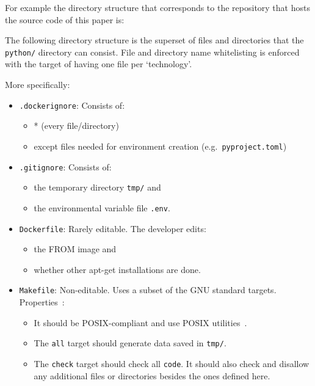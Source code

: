 \documentclass[journal]{IEEEtran}
\begin{document}
For example the directory structure that corresponds to the repository that hosts the source code of this paper is:

The following directory structure is the superset of files and directories that the \texttt{python/} directory can consist.
File and directory name whitelisting is enforced with the target of having one file per `technology'.

More specifically:
\begin{itemize}
	\item \texttt{.dockerignore}: Consists of:
		\begin{itemize}
			\item * (every file/directory)
			\item except files needed for environment creation (e.g.\ \texttt{pyproject.toml})
		\end{itemize}
	\item \texttt{.gitignore}: Consists of:
		\begin{itemize}
			\item the temporary directory \texttt{tmp/} and
			\item the environmental variable file \texttt{.env}.
		\end{itemize}
	\item \texttt{Dockerfile}: Rarely editable. The developer edits:
		\begin{itemize}
			\item the FROM image and
			\item whether other apt-get installations are done.
		\end{itemize}
	\item \texttt{Makefile}: Non-editable. Uses a subset of the GNU standard targets. Properties~\cite{stallman1992gnu}:
		\begin{itemize}
			\item It should be POSIX-compliant and use POSIX utilities~\cite{lewine1991posix}.
			\item The \texttt{all} target should generate data saved in \texttt{tmp/}.
			\item The \texttt{check} target should check all \texttt{code}. It should also check and disallow any additional files or directories besides the ones defined here.

\end{itemize}
\end{itemize}
\end{document}
